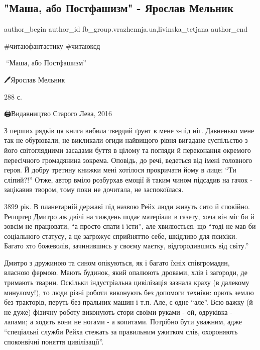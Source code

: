  
 
 
 
 

\subsection{"Маша, або Постфашизм" - Ярослав Мельник}
\label{sec:17_02_2023.fb.fb_group.vrazhennja.ua.1._masha__abo_postfash}
 
\ifcmt
 author_begin
   author_id fb_group.vrazhennja.ua,livinska_tetjana
 author_end
\fi

\#читаюфантастику \#читаюксд 

📘\enquote{Маша, або Постфашизм} 

🖊️Ярослав Мельник

288 с.

🖨️Видавництво Старого Лева, 2016

З перших рядків ця книга вибила твердий ґрунт в мене з-під ніг. Давненько мене
так не обурювали, не викликали огиди найвищого рівня вигадане суспільство з
його світоглядними засадами буття в цілому та погляди й переконання окремого
пересічного громадянина зокрема. Оповідь, до речі, ведеться від імені головного
героя. Й добру третину книжки мені хотілося прокричати йому в лице: \enquote{Ти
сліпий?!} Отже, автор вміло розбурхав емоції й таким чином підсадив на гачок -
зацікавив твором, тому поки не дочитала, не заспокоїлася. 

3899 рік. В планетарній державі під назвою Рейх люди живуть сито й спокійно.
Репортер Дмитро аж двічі на тиждень подає матеріали в газету, хоча він міг би й
зовсім не працювати, \enquote{а просто спати і їсти}, але хвилюється, що \enquote{тоді не мав
би соціального статусу, а це загрожує сприйняттю себе, шкідливо для психіки.
Багато хто божеволів, зачинившись у своєму маєтку, відгородившись від світу.} 

Дмитро з дружиною та сином опікуються, як і багато їхніх співгромадян, власною
фермою. Мають будинок, який опалюють дровами, хлів і загороди, де тримають
тварин. Оскільки індустріальна цивілізація зазнала краху (в далекому
минулому!), то люди різні роботи виконують без допомоги техніки: орють землю
без тракторів, перуть без пральних машин і т.п. Але, є одне \enquote{але}. Всю важку (й
не дуже) фізичну роботу виконують стори своїми руками - ой, одруківка - лапами;
а ходять вони не ногами - а копитами. Потрібно бути уважним, адже \enquote{спеціальні
служби Рейха стежать за правильним ужитком слів, охороняють споконвічні поняття
цивілізації}. 

